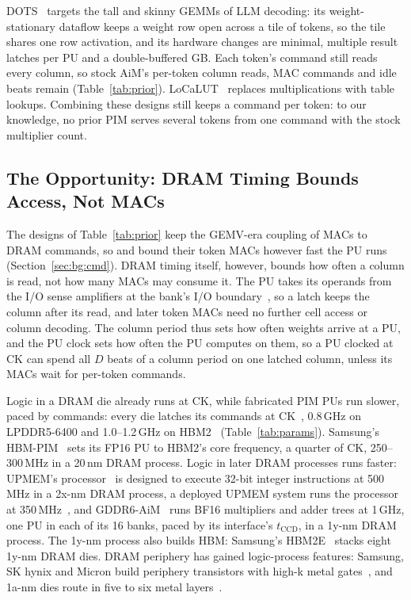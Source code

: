 DOTS~\cite{dots} targets the tall and skinny GEMMs of LLM decoding: its weight-stationary dataflow keeps a weight row
open across a tile of tokens, so the tile shares one row activation, and its hardware changes are minimal, multiple
result latches per PU and a double-buffered GB. Each token's command still reads every column, so stock AiM's
per-token column reads, MAC commands and idle beats remain (Table~\ref{tab:prior}). LoCaLUT~\cite{localut} replaces
multiplications with table lookups. Combining these designs still keeps a command per token: to our knowledge, no
prior PIM serves several tokens from one command with the stock multiplier count.

\subsection{The Opportunity: DRAM Timing Bounds Access, Not MACs}
\label{sec:bg:depth}

The designs of Table~\ref{tab:prior} keep the GEMV-era coupling of MACs to DRAM commands, so \tccds{} and \tccdl{}
bound their token MACs however fast the PU runs (Section~\ref{sec:bg:cmd}). DRAM timing itself, however, bounds how often a column is read, not
how many MACs may consume it. The PU takes its operands from the I/O sense amplifiers at the bank's I/O
boundary~\cite{hbmpim}, so a latch keeps the column after its read, and later token MACs need no further cell
access or column decoding. The column
period thus sets how often weights arrive at a PU, and the PU clock sets how often the PU computes on them, so a PU
clocked at CK can spend all $D$ beats of a column period on one latched column, unless its MACs wait for
per-token commands.

Logic in a DRAM die already runs at CK, while fabricated PIM PUs run slower, paced by commands: every die latches its commands at
CK~\cite{jedeclpddr5,jedechbm2}, 0.8\,GHz on LPDDR5-6400 and 1.0--1.2\,GHz on HBM2~\cite{hbmpim}
(Table~\ref{tab:params}). Samsung's HBM-PIM~\cite{hbmpim} sets its FP16 PU to
HBM2's core frequency, a quarter of CK, 250--300\,MHz in a 20\,nm DRAM process. Logic in later DRAM processes runs
faster: UPMEM's processor~\cite{devaux} is designed to execute 32-bit integer instructions at 500\,MHz in a 2x-nm DRAM
process, a deployed UPMEM system runs the processor at 350\,MHz~\cite{prim}, and GDDR6-AiM~\cite{aimjssc} runs BF16
multipliers and adder trees at 1\,GHz, one PU in each of its 16 banks, paced by its interface's $t_\mathrm{CCD}$, in a 1y-nm
DRAM process. The 1y-nm process also builds HBM: Samsung's HBM2E~\cite{flashbolt} stacks eight 1y-nm DRAM dies.
DRAM periphery has gained logic-process
features: Samsung, SK hynix and Micron build periphery transistors with high-k metal gates~\cite{tiroadmap}, and
1a-nm dies route in five to six metal layers~\cite{tid1a16,tid1a24}.

